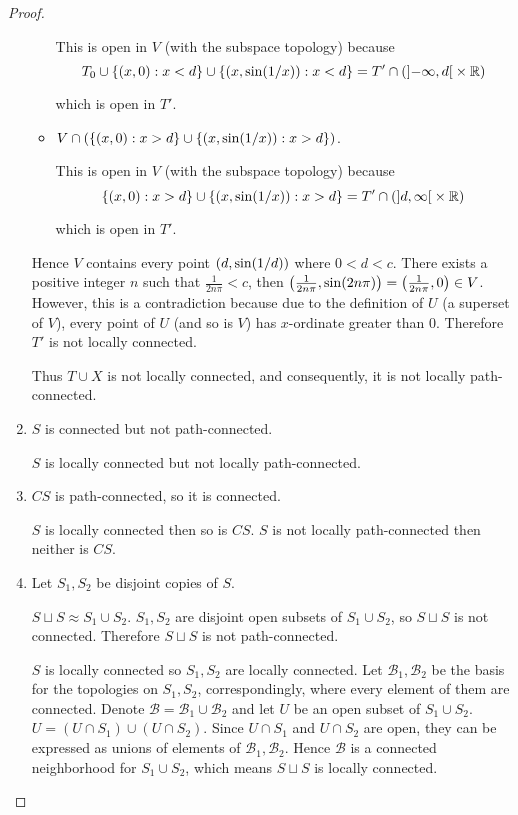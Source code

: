 \begin{proof}
\begin{enumerate}[label={(\alph*)}]
\begin{itemize}
			            This is open in $V$ (with the subspace topology) because
			            \begin{equation*}
				            T_{0} \cup \left\{{\left({x,0}\right) : x < d}\right\} \cup \left\{{\left({x, \sin(1/x)}\right) : x < d}\right\} = T' \cap (\left]{-\infty, d}\right[ \times\mathbb{R})
			            \end{equation*}

			            which is open in $T'$.
			      \item $V \cap (\left\{{\left({x,0}\right) : x > d}\right\} \cup \left\{{ \left({x, \sin(1/x)}\right) : x > d }\right\})$.

			            This is open in $V$ (with the subspace topology) because
			            \begin{equation*}
				            \left\{{\left({x,0}\right) : x > d}\right\} \cup \left\{{\left({x, \sin(1/x)}\right) : x > d}\right\} = T' \cap (\left]{d, \infty}\right[ \times\mathbb{R})
			            \end{equation*}

			            which is open in $T'$.
		      \end{itemize}

		      Hence $V$ contains every point $\left({d, \sin(1/d)}\right)$ where $0 < d < c$. There exists a positive integer $n$ such that $\frac{1}{2n\pi} < c$, then $\left({\frac{1}{2n\pi}, \sin(2n\pi)}\right) = \left({\frac{1}{2n\pi}, 0}\right) \in V$. However, this is a contradiction because due to the definition of $U$ (a superset of $V$), every point of $U$ (and so is $V$) has $x$-ordinate greater than 0. Therefore $T'$ is not locally connected.

		      Thus $T\cup X$ is not locally connected, and consequently, it is not locally path-connected.
		\item $S$ is connected but not path-connected.

		      $S$ is locally connected but not locally path-connected.
		\item $CS$ is path-connected, so it is connected.

		      $S$ is locally connected then so is $CS$. $S$ is not locally path-connected then neither is $CS$.
		\item Let $S_{1}, S_{2}$ be disjoint copies of $S$.

		      $S\sqcup S \approx S_{1}\cup S_{2}$. $S_{1}, S_{2}$ are disjoint open subsets of $S_{1}\cup S_{2}$, so $S\sqcup S$ is not connected. Therefore $S\sqcup S$ is not path-connected.

		      $S$ is locally connected so $S_{1}, S_{2}$ are locally connected. Let $\mathscr{B}_{1}, \mathscr{B}_{2}$ be the basis for the topologies on $S_{1}, S_{2}$, correspondingly, where every element of them are connected. Denote $\mathscr{B} = \mathscr{B}_{1} \cup \mathscr{B}_{2}$ and let $U$ be an open subset of $S_{1}\cup S_{2}$. $U = (U\cap S_{1}) \cup (U\cap S_{2})$. Since $U\cap S_{1}$ and $U\cap S_{2}$ are open, they can be expressed as unions of elements of $\mathscr{B}_{1}, \mathscr{B}_{2}$. Hence $\mathscr{B}$ is a connected neighborhood for $S_{1}\cup S_{2}$, which means $S\sqcup S$ is locally connected.


\end{enumerate}
\end{proof}
